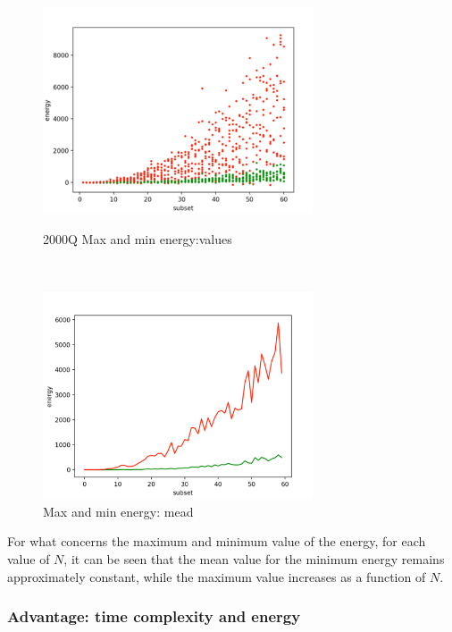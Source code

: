 \documentclass[oneside,a4paper]{article}
\begin{document}
\newpage
\begin{figure}[htp]
\begin{minipage}[b]{7.5cm}
\centering
\includegraphics[width=8cm]{LaTeXTemplate/Images/2000QMaxMinEnValue.png}
\caption{2000Q Max and min energy:values}
\end{minipage}
\ \hspace{2mm} \hspace{2mm} \
\begin{minipage}[b]{9cm}
\centering
\includegraphics[width=8cm]{LaTeXTemplate/Images/2000QMaxMinEnMean.png}
\caption{Max and min energy: mead}
\end{minipage}
\end{figure}
For what concerns the maximum and minimum value of the energy, for each value of $N$, it can be seen that the mean value for the minimum energy remains approximately constant, while the maximum value increases as a function of $N$.

\subsubsection{Advantage: time complexity and energy}
\end{document}
